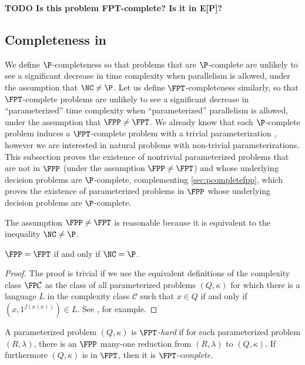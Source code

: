 \documentclass{article}
\newcommand{\todo}[1]{\textbf{TODO #1}}
\begin{document}
\todo{Is this problem FPT-complete? Is it in E[P]?}

\subsection{Completeness in \texorpdfstring{\FPT}{FPT}}

We define $\P$-completeness so that problems that are $\P$-complete are unlikely to see a significant decrease in time complexity when parallelism is allowed, under the assumption that $\NC \neq \P$.
Let us define $\FPT$-completeness similarly, so that $\FPT$-complete problems are unlikely to see a significant decrease in ``parameterized'' time complexity when ``parameterized'' parallelism is allowed, under the assumption that $\FPP \neq \FPT$.
We already know that each $\P$-complete problem induces a $\FPT$-complete problem with a trivial parameterization \autocite[Proposition~14]{fg03}, however we are interested in natural problems with non-trivial parameterizations.
This subsection proves the existence of nontrivial parameterized problems that are not in $\FPP$ (under the assumption $\FPP \neq \FPT$) and whose underlying decision problems are $\P$-complete, complementing \autoref{sec:pcompletefpp}, which proves the existence of parameterized problems in $\FPP$ whose underlying decision problems are $\P$-complete.

The assumption $\FPP \neq \FPT$ is reasonable because it is equivalent to the inequality $\NC \neq \P$.

\begin{proposition}
  $\FPP = \FPT$ if and only if $\NC = \P$.
\end{proposition}
\begin{proof}
  The proof is trivial if we use the equivalent definitions of the complexity class $\FP \mathcal{C}$ as the class of all parameterized problems $(Q, \kappa)$ for which there is a language $L$ in the complexity class $\mathcal{C}$ such that $x \in Q$ if and only if $(x, 1^{f(\kappa(x))}) \in L$.
  See \autocite{fg03}, for example.
\end{proof}


\begin{definition}
  A parameterized problem $(Q, \kappa)$ is \emph{$\FPT$-hard} if for each parameterized problem $(R, \lambda)$, there is an $\FPP$ many-one reduction from $(R, \lambda)$ to $(Q, \kappa)$.
  If furthermore $(Q, \kappa)$ is in $\FPT$, then it is \emph{$\FPT$-complete}.
\end{definition}
\end{document}

